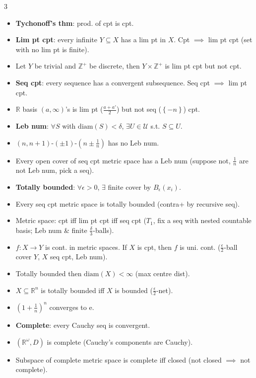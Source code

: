 \documentclass[10pt]{article}
\newcommand{\R}{\mathbb{R}} %
\newcommand{\Z}{\mathbb{Z}} %
\newcommand{\e}{\mathrm{e}} %
\begin{document}
\begin{multicols*}{3}
\begin{itemize}
            \item \textbf{Tychonoff's thm}: prod. of cpt is cpt.
            \item \textbf{Lim pt cpt}: every infinite $Y \subseteq X$ has a lim pt in $X$. Cpt $\implies$ lim pt cpt (set with no lim pt is finite).
            \item Let $Y$ be trivial and $\Z^+$ be discrete, then $Y \times \Z^+$ is lim pt cpt but not cpt.
            \item \textbf{Seq cpt}: every sequence has a convergent subsequence. Seq cpt $\implies$ lim pt cpt.
            \item $\R$ basis $\left(a, \infty\right)$'s is lim pt ($\frac{a + a'}{2}$) but not seq ($\left\{-n\right\}$) cpt.
            \item \textbf{Leb num}: $\forall S$ with $\mathrm{diam}\left(S\right) < \delta$, $\exists U \in \mathcal{U}$ s.t. $S \subseteq U$. 
            \item $\left(n, n + 1\right)$-$\left(\pm 1\right)$-$\left(n \pm \frac{1}{n}\right)$ has no Leb num.
            \item Every open cover of seq cpt metric space has a Leb num (suppose not, $\frac{1}{n}$ are not Leb num, pick a seq).
            \item \textbf{Totally bounded}: $\forall \epsilon > 0$, $\exists$ finite cover by $B_{\epsilon}\left(x_i\right)$.
            \item Every seq cpt metric space is totally bounded (contra+ by recursive seq).
            \item Metric space: cpt iff lim pt cpt iff seq cpt ($T_1$, fix a seq with nested countable basis; Leb num \& finite $\frac{\delta}{3}$-balls).
            \item $f \colon X \to Y$ is cont. in metric spaces. If $X$ is cpt, then $f$ is uni. cont. ($\frac{\epsilon}{2}$-ball cover $Y$, $X$ seq cpt, Leb num).
            \item Totally bounded then $\mathrm{diam}\left(X\right) < \infty$ (max centre dist).
            \item $X \subseteq \R^n$ is totally bounded iff $X$ is bounded ($\frac{\epsilon}{2}$-net).
            \item $\left(1 + \frac{1}{n}\right)^n$ converges to $\e$.
            \item \textbf{Complete}: every Cauchy seq is convergent.
            \item $\left(\R^{\omega}, D\right)$ is complete (Cauchy's components are Cauchy).
            \item Subspace of complete metric space is complete iff closed (not closed $\implies$ not complete).

\end{itemize}
\end{multicols*}
\end{document}
